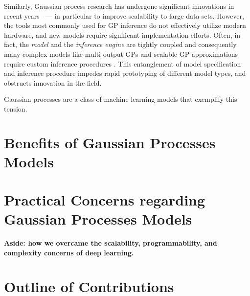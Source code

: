 Similarly, Gaussian process research has undergone significant innovations in recent years~\cite{titsias2009variational,hensman2013gaussian,wilson2014thesis,wilson2015kernel,wilson2015thoughts,cunningham2008fast} --- in particular to improve scalability to large data sets. However,
the tools most commonly used for GP inference do not effectively utilize modern hardware, and new models require significant implementation efforts. Often, in fact, the \emph{model} and the \emph{inference engine} are tightly coupled and consequently many complex models like multi-output GPs and scalable GP approximations require custom inference procedures \cite{hensman2015scalable,bonilla2008multi}. This entanglement of model specification and inference procedure impedes rapid prototyping of different model types, and obstructs innovation in the field.



Gaussian processes are a class of machine learning models that exemplify this tension.


\section{Benefits of Gaussian Processes Models}

\section{Practical Concerns regarding Gaussian Processes Models}

\paragraph{Aside: how we overcame the scalability, programmability, and complexity concerns of deep learning.}

\section{Outline of Contributions}

